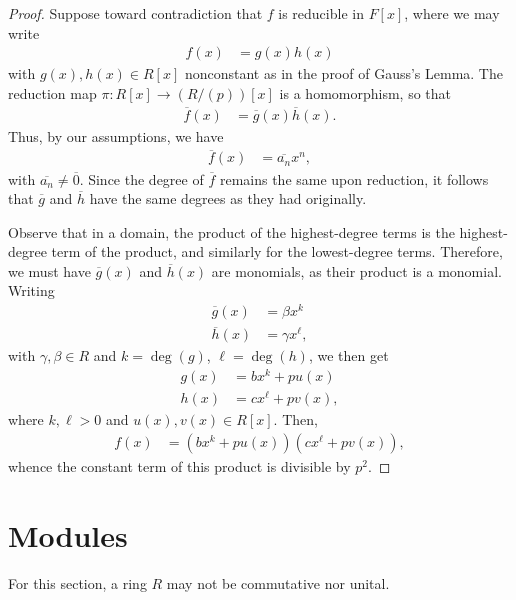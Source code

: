 \documentclass[10pt]{mypackage}
\begin{document}
\begin{proof}
  Suppose toward contradiction that $f$ is reducible in $F[x]$, where we may write
  \begin{align*}
    f(x) &= g(x)h(x)
  \end{align*}
  with $g(x),h(x)\in R[x]$ nonconstant as in the proof of Gauss's Lemma. The reduction map $\pi\colon R[x]\rightarrow \left( R/\left( p \right) \right)[x]$ is a homomorphism, so that
  \begin{align*}
    \overline{f}(x) &= \overline{g}(x) \overline{h}(x).
  \end{align*}
  Thus, by our assumptions, we have
  \begin{align*}
    \overline{f}(x) &= \overline{a_n}x^{n},
  \end{align*}
  with $ \overline{a_n}\neq \overline{0} $. Since the degree of $ \overline{f} $ remains the same upon reduction, it follows that $ \overline{g} $ and $ \overline{h} $ have the same degrees as they had originally.%

  Observe that in a domain, the product of the highest-degree terms is the highest-degree term of the product, and similarly for the lowest-degree terms. Therefore, we must have $ \overline{g}(x) $ and $ \overline{h}(x) $ are monomials, as their product is a monomial. Writing
  \begin{align*}
  \overline{g}(x) &= \beta x^{k}\\
  \overline{h}(x) &= \gamma x^{\ell},
  \end{align*}
  with $\gamma,\beta\in R$ and $k = \deg(g)$, $\ell = \deg(h)$, we then get
  \begin{align*}
    g(x) &= bx^{k} + p u(x)\\
    h(x) &= cx^{\ell} + p v(x),
  \end{align*}
  where $k,\ell > 0$ and $u(x),v(x)\in R[x]$. Then,
  \begin{align*}
    f(x) &= \left( bx^{k} + pu(x) \right)\left( cx^{\ell} + pv(x) \right),
  \end{align*}
  whence the constant term of this product is divisible by $p^2$.
\end{proof}
\section{Modules}%
For this section, a ring $R$ may not be commutative nor unital.
\end{document}
